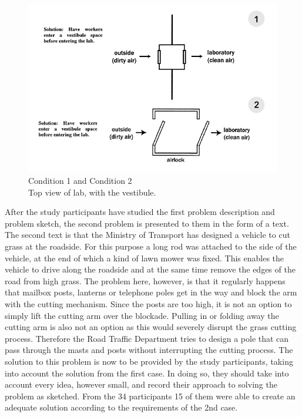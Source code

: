 \documentclass[12pt]{article}
\begin{document}
\begin{figure}[H]
  \centering
  \includegraphics[width=0.7\linewidth]{images/input_conditons.PNG}
  \caption{\label{fig:input_conditions} Condition 1 and Condition 2 \\ Top view of lab, with the vestibule.}
\end{figure}     

After the study participants have studied the first problem description and problem sketch, the second problem is presented to them in the form of a text. 
The second text is that the Ministry of Transport has designed a vehicle to cut grass at the roadside. For this purpose a long rod was attached to the side of the vehicle, at the end of which a kind of lawn mower was fixed. This enables the vehicle to drive along the roadside and at the same time remove the edges of the road from high grass. The problem here, however, is that it regularly happens that mailbox posts, lanterns or telephone poles get in the way and block the arm with the cutting mechanism. Since the posts are too high, it is not an option to simply lift the cutting arm over the blockade. Pulling in or folding away the cutting arm is also not an option as this would severely disrupt the grass cutting process. Therefore the Road Traffic Department tries to design a pole that can pass through the masts and posts without interrupting the cutting process. The solution to this problem is now to be provided by the study participants, taking into account the solution from the first case. In doing so, they should take into account every idea, however small, and record their approach to solving the problem as sketched.  From the 34 participants 15 of them were able to create an adequate solution according to the requirements of the 2nd case. 
\end{document}

